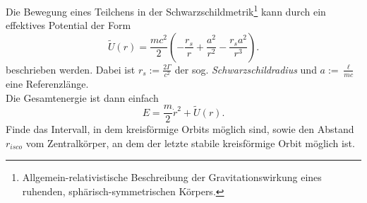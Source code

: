 \begin{Exercise}[label = lso, difficulty = 3, origin = Aaron Wild, title = Schwarzschildmetrik]
	Die Bewegung eines Teilchens in der Schwarzschildmetrik\footnote[3]{Allgemein-relativistische Beschreibung der Gravitationswirkung eines ruhenden, sphärisch-symmetrischen Körpers.} kann durch ein effektives Potential der Form
	\begin{equation}\label{lso:ep}
		\tilde{U}\left(r\right) = \frac{mc^2}{2} \left(-\frac{r_s}{r} + \frac{a^2}{r^2} - \frac{r_sa^2}{r^3}\right).
	\end{equation}
	beschrieben werden. Dabei ist $r_s := \frac{2\Gamma}{c^2}$ der sog. \textit{Schwarzschildradius} und $ a := \frac{\ell}{mc}$ eine Referenzlänge.\\
	Die Gesamtenergie ist dann einfach
	\begin{equation}\label{lso:ene}
		E = \frac{m}{2}\dot{r}^2 + \tilde{U}\left(r\right).
	\end{equation}
	Finde das Intervall, in dem kreisförmige Orbits möglich sind, sowie den Abstand $r_{isco}$ vom Zentralkörper, an dem der letzte stabile kreisförmige Orbit möglich ist.
\end{Exercise}